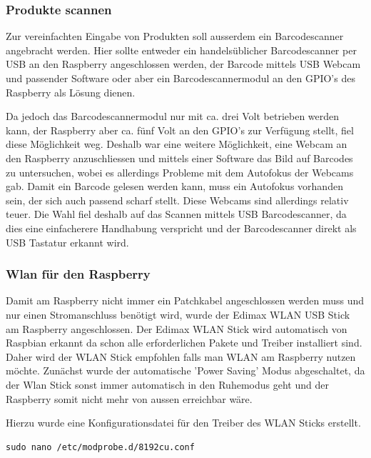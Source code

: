 \documentclass[11pt,a4paper]{article} %
\begin{document}
\subsubsection{Produkte scannen}
Zur vereinfachten Eingabe von Produkten soll ausserdem ein Barcodescanner angebracht werden. Hier sollte entweder ein handelsüblicher Barcodescanner per USB an den Raspberry angeschlossen werden, der Barcode mittels USB Webcam und passender Software oder aber ein Barcodescannermodul an den GPIO's des Raspberry als Lösung dienen.
\par
 Da jedoch das Barcodescannermodul nur mit ca. drei Volt betrieben werden kann, der Raspberry aber ca. fünf Volt an den GPIO's zur Verfügung stellt, fiel diese Möglichkeit weg. Deshalb war eine weitere Möglichkeit, eine Webcam an den Raspberry anzuschliessen und mittels einer Software das Bild auf Barcodes zu untersuchen, wobei es allerdings Probleme mit dem Autofokus der Webcams gab. Damit ein Barcode gelesen werden kann, muss ein Autofokus vorhanden sein, der sich auch passend scharf stellt. Diese Webcams sind allerdings relativ teuer. Die Wahl fiel deshalb auf das Scannen mittels USB Barcodescanner, da dies eine einfacherere Handhabung verspricht und der Barcodescanner direkt als USB Tastatur erkannt wird.
\par
\subsubsection{Wlan für den Raspberry}
Damit am Raspberry nicht immer ein Patchkabel angeschlossen werden muss und nur einen Stromanschluss benötigt wird, wurde der Edimax WLAN USB Stick\cite{8} am Raspberry angeschlossen. Der Edimax WLAN Stick wird automatisch von Raspbian erkannt da schon alle erforderlichen Pakete und Treiber installiert sind. Daher wird der WLAN Stick empfohlen falls man WLAN am Raspberry nutzen möchte. Zunächst wurde der automatische 'Power Saving' Modus abgeschaltet, da der Wlan Stick sonst immer automatisch in den Ruhemodus geht und der Raspberry somit nicht mehr von aussen erreichbar wäre.

Hierzu wurde eine Konfigurationsdatei für den Treiber des WLAN Sticks erstellt.
\begin{frame}

\begin{lstlisting}
sudo nano /etc/modprobe.d/8192cu.conf
\end{lstlisting}

\end{frame}
\par
\end{document}
